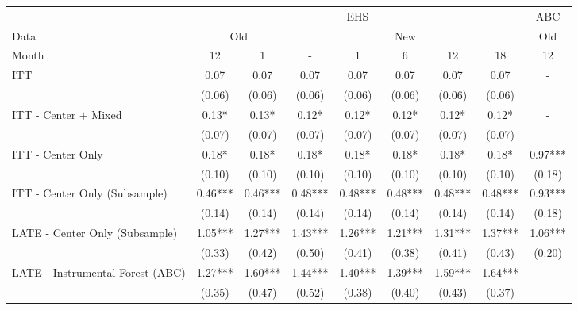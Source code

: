 \begin{tabular}{lcccccccc}
\toprule 
\midrule 
 & \multicolumn{7}{c}{EHS} & ABC \\
 \cmidrule(lr){2-8} \cmidrule(lr){9-9} 
Data & \multicolumn{2}{c}{Old} & \multicolumn{5}{c}{New} & Old \\
 \cmidrule(lr){1-1} \cmidrule(lr){2-3} \cmidrule(lr){4-8} \cmidrule(lr){9-9} 
Month & 12 & 1 & - & 1 & 6 & 12 & 18 & 12 \\
\midrule 
ITT & 0.07 & 0.07 & 0.07 & 0.07 & 0.07 & 0.07 & 0.07 & - \\
 & (0.06) & (0.06) & (0.06) & (0.06) & (0.06) & (0.06) & (0.06) \\
ITT - Center $+$ Mixed & 0.13* & 0.13* & 0.12* & 0.12* & 0.12* & 0.12* & 0.12* & - \\
 & (0.07) & (0.07) & (0.07) & (0.07) & (0.07) & (0.07) & (0.07) \\
ITT - Center Only & 0.18* & 0.18* & 0.18* & 0.18* & 0.18* & 0.18* & 0.18* & 0.97*** \\
 & (0.10) & (0.10) & (0.10) & (0.10) & (0.10) & (0.10) & (0.10) & (0.18) \\
ITT - Center Only (Subsample) & 0.46*** & 0.46*** & 0.48*** & 0.48*** & 0.48*** & 0.48*** & 0.48*** & 0.93*** \\
 & (0.14) & (0.14) & (0.14) & (0.14) & (0.14) & (0.14) & (0.14) & (0.18) \\
LATE - Center Only (Subsample) & 1.05*** & 1.27*** & 1.43*** & 1.26*** & 1.21*** & 1.31*** & 1.37*** & 1.06*** \\
 & (0.33) & (0.42) & (0.50) & (0.41) & (0.38) & (0.41) & (0.43) & (0.20) \\
LATE - Instrumental Forest (ABC) & 1.27*** & 1.60*** & 1.44*** & 1.40*** & 1.39*** & 1.59*** & 1.64*** & - \\
 & (0.35) & (0.47) & (0.52) & (0.38) & (0.40) & (0.43) & (0.37) \\
\midrule 
\bottomrule 
\end{tabular}
